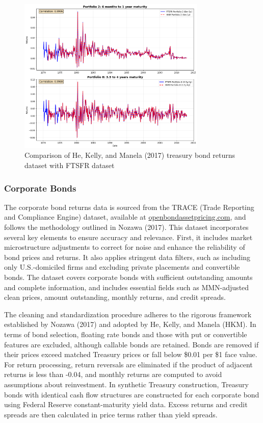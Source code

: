 \documentclass{article}
\begin{document}
\begin{appendices}
\begin{figure}[h]
  \centering
  \includegraphics[width=0.8\textwidth]{../docs_src/us_treasury_compare.png}
  \caption{Comparison of He, Kelly, and Manela (2017) treasury bond returns dataset with FTSFR dataset}
  \label{fig:us_treasury_returns_comparison}
\end{figure}

\subsubsection{Corporate Bonds}
\label{sec:corporate_bonds}

The corporate bond returns data is sourced from the TRACE (Trade Reporting and Compliance Engine) dataset, available at \url{openbondassetpricing.com}, and follows the methodology outlined in Nozawa (2017). This dataset incorporates several key elements to ensure accuracy and relevance. First, it includes market microstructure adjustments to correct for noise and enhance the reliability of bond prices and returns. It also applies stringent data filters, such as including only U.S.-domiciled firms and excluding private placements and convertible bonds. The dataset covers corporate bonds with sufficient outstanding amounts and complete information, and includes essential fields such as MMN-adjusted clean prices, amount outstanding, monthly returns, and credit spreads.

The cleaning and standardization procedure adheres to the rigorous framework established by Nozawa (2017) and adopted by He, Kelly, and Manela (HKM). In terms of bond selection, floating rate bonds and those with put or convertible features are excluded, although callable bonds are retained. Bonds are removed if their prices exceed matched Treasury prices or fall below \$0.01 per \$1 face value. For return processing, return reversals are eliminated if the product of adjacent returns is less than -0.04, and monthly returns are computed to avoid assumptions about reinvestment. In synthetic Treasury construction, Treasury bonds with identical cash flow structures are constructed for each corporate bond using Federal Reserve constant-maturity yield data. Excess returns and credit spreads are then calculated in price terms rather than yield spreads.


\end{appendices}
\end{document}
